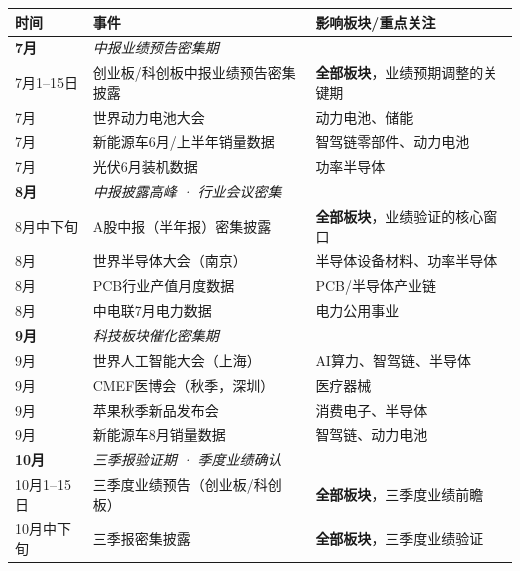 \begin{exhibitbox}[表9-32：2026年下半年财报与行业重点事件日历]
\scriptsize
\setlength{\tabcolsep}{3pt}
\renewcommand{\arraystretch}{1.12}
\begin{tabularx}{\textwidth}{l X l}
\toprule
\textbf{时间} & \textbf{事件} & \textbf{影响板块/重点关注} \\
\midrule
\rowcolor{navy!5}
\textbf{7月} & \multicolumn{2}{l}{\textit{中报业绩预告密集期}} \\
\rowcolor{navy!5}
7月1--15日 & 创业板/科创板中报业绩预告密集披露 & \textbf{全部板块}，业绩预期调整的关键期 \\
\rowcolor{navy!5}
7月 & 世界动力电池大会 & 动力电池、储能 \\
\rowcolor{navy!5}
7月 & 新能源车6月/上半年销量数据 & 智驾链零部件、动力电池 \\
\rowcolor{navy!5}
7月 & 光伏6月装机数据 & 功率半导体 \\
\midrule
\rowcolor{accentblue!5}
\textbf{8月} & \multicolumn{2}{l}{\textit{中报披露高峰 · 行业会议密集}} \\
\rowcolor{accentblue!5}
8月中下旬 & A股中报（半年报）密集披露 & \textbf{全部板块}，业绩验证的核心窗口 \\
\rowcolor{accentblue!5}
8月 & 世界半导体大会（南京） & 半导体设备材料、功率半导体 \\
\rowcolor{accentblue!5}
8月 & PCB行业产值月度数据 & PCB/半导体产业链 \\
\rowcolor{accentblue!5}
8月 & 中电联7月电力数据 & 电力公用事业 \\
\midrule
\rowcolor{riskgreen!5}
\textbf{9月} & \multicolumn{2}{l}{\textit{科技板块催化密集期}} \\
\rowcolor{riskgreen!5}
9月 & 世界人工智能大会（上海） & AI算力、智驾链、半导体 \\
\rowcolor{riskgreen!5}
9月 & CMEF医博会（秋季，深圳） & 医疗器械 \\
\rowcolor{riskgreen!5}
9月 & 苹果秋季新品发布会 & 消费电子、半导体 \\
\rowcolor{riskgreen!5}
9月 & 新能源车8月销量数据 & 智驾链、动力电池 \\
\midrule
\rowcolor{riskamber!5}
\textbf{10月} & \multicolumn{2}{l}{\textit{三季报验证期 · 季度业绩确认}} \\
\rowcolor{riskamber!5}
10月1--15日 & 三季度业绩预告（创业板/科创板） & \textbf{全部板块}，三季度业绩前瞻 \\
\rowcolor{riskamber!5}
10月中下旬 & 三季报密集披露 & \textbf{全部板块}，三季度业绩验证 \\

\end{tabularx}
\end{exhibitbox}
